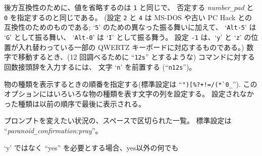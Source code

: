 後方互換性のために、値を省略するのは {\tt 1} と同じで、
否定する {\it number\verb+_+pad\/} と {\tt 0} を指定するのと同じである。
(設定 {\tt 2} と {\tt 4} は MS-DOS や古い PC Hack との互換性のためのものである;
`{\tt 5}' のための異なった振る舞いに加えて、
`{\tt Alt-5}' は `{\tt G}' として振る舞い、
`{\tt Alt-0}' は `{\tt I}' として振る舞う。
設定 {\tt -1} は、`{\tt y}' と `{\tt z}' の位置が入れ替わっている一部の
QWERTZ キーボードに対応するものである。)
数字で移動するとき、(12 回調べるために ``{\tt 12s}'' とするような)
コマンドに対する回数接頭辞を入力するには、
文字 `{\tt n}' を前置する (``{\tt n12s}'')。
\item[\ib{packorder}]
物の種類を表示するときの順番を指定する(標準設定は
``\verb&")[%?+!=/(*`0_&'').
このオプションにはいろいろな物の種類を表す文字の列を設定する。
設定されなかった種類は以前の順序で最後に表示される。
\item[\ib{paranoid\verb+_+confirmation}]
プロンプトを変えたい状況の、スペースで区切られた一覧。
標準設定は\\
``{\it paranoid\verb+_+confirmation:pray}''。
\newlength{\pcwidth}
\settowidth{\pcwidth}{\tt Were-change}
\addtolength{\pcwidth}{\labelsep}
\blist{\leftmargin \pcwidth \topsep 1mm \itemsep 0mm}
\item[{\tt Confirm}]
`y' ではなく ``yes'' を必要とする場合、yes以外の何でも
